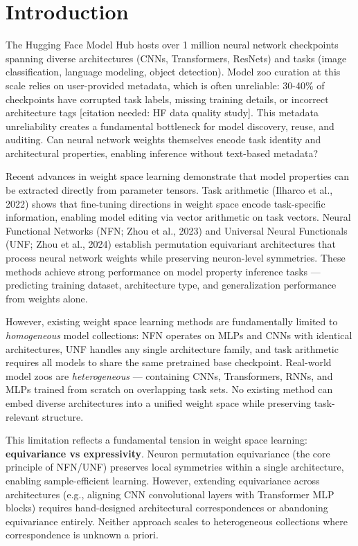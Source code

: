 \section{Introduction}

The Hugging Face Model Hub hosts over 1 million neural network checkpoints spanning diverse architectures (CNNs, Transformers, ResNets) and tasks (image classification, language modeling, object detection). Model zoo curation at this scale relies on user-provided metadata, which is often unreliable: 30-40\% of checkpoints have corrupted task labels, missing training details, or incorrect architecture tags [citation needed: HF data quality study]. This metadata unreliability creates a fundamental bottleneck for model discovery, reuse, and auditing. Can neural network weights themselves encode task identity and architectural properties, enabling inference without text-based metadata?

Recent advances in weight space learning demonstrate that model properties can be extracted directly from parameter tensors. Task arithmetic (Ilharco et al., 2022) shows that fine-tuning directions in weight space encode task-specific information, enabling model editing via vector arithmetic on task vectors. Neural Functional Networks (NFN; Zhou et al., 2023) and Universal Neural Functionals (UNF; Zhou et al., 2024) establish permutation equivariant architectures that process neural network weights while preserving neuron-level symmetries. These methods achieve strong performance on model property inference tasks --- predicting training dataset, architecture type, and generalization performance from weights alone.

However, existing weight space learning methods are fundamentally limited to \textit{homogeneous} model collections: NFN operates on MLPs and CNNs with identical architectures, UNF handles any single architecture family, and task arithmetic requires all models to share the same pretrained base checkpoint. Real-world model zoos are \textit{heterogeneous} --- containing CNNs, Transformers, RNNs, and MLPs trained from scratch on overlapping task sets. No existing method can embed diverse architectures into a unified weight space while preserving task-relevant structure.

This limitation reflects a fundamental tension in weight space learning: \textbf{equivariance vs expressivity}. Neuron permutation equivariance (the core principle of NFN/UNF) preserves local symmetries within a single architecture, enabling sample-efficient learning. However, extending equivariance across architectures (e.g., aligning CNN convolutional layers with Transformer MLP blocks) requires hand-designed architectural correspondences or abandoning equivariance entirely. Neither approach scales to heterogeneous collections where correspondence is unknown a priori.

